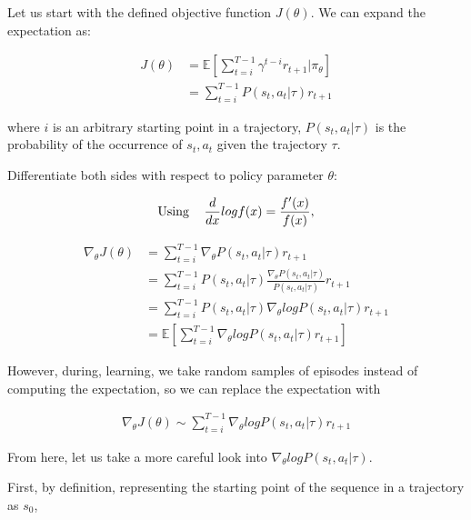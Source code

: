 \documentclass[letterpaper,11pt]{article}
\begin{document}
Let us start with the defined objective function $J(\theta)$. We can expand the expectation as:

$$
\begin{aligned}
J(\theta) &= \mathbb{E}[\sum\limits_{t=i}^{T-1} \gamma^{t-i} r_{t+1} | \pi_{\theta}] \\ &= \sum\limits_{t=i}^{T-1}P(s_{t}, a_{t} | \tau) r_{t+1}
\end{aligned}
$$

\noindent where $i$ is an arbitrary starting point in a trajectory, $P(s_{t}, a_{t} | \tau)$ is the probability of the occurrence of $s_{t}, a_{t}$ given the
trajectory $\tau$.
\vspace{0.5cm}

\noindent Differentiate both sides with respect to policy parameter $\theta$:

$$
\text{Using  \hspace{0.3cm}}
\begin{aligned}
    \frac{d}{dx} log f(x) = \frac{f'(x)}{f(x)},
\end{aligned}
$$

$$
\begin{aligned}
    \nabla_{\theta} J(\theta) & = \sum\limits_{t=i}^{T-1} \nabla_{\theta} P(s_{t}, a_{t} | \tau) r_{t+1} \\ 
    & = \sum\limits_{t=i}^{T-1} P(s_{t}, a_{t} | \tau) \frac{\nabla_{\theta} P(s_{t}, a_{t} | \tau)}{P(s_{t}, a_{t} | \tau)} r_{t+1} \\ 
    & = \sum\limits_{t=i}^{T-1} P(s_{t}, a_{t} | \tau) \nabla_{\theta} log P(s_{t}, a_{t} | \tau) r_{t+1} \\ 
    & = \mathbb{E} [\sum\limits_{t=i}^{T-1} \nabla_{\theta} log P(s_{t}, a_{t} | \tau) r_{t+1}]
\end{aligned}
$$

\noindent However, during, learning, we take random samples of episodes instead of computing the expectation, so we can replace the expectation with 

$$
\begin{aligned}
    \nabla_{\theta} J(\theta) \sim \sum\limits_{t=i}^{T-1} \nabla_{\theta} log P(s_{t}, a_{t} | \tau) r_{t+1}
\end{aligned}
$$

\noindent From here, let us take a more careful look into $\nabla_{\theta} log P(s_{t}, a_{t} | \tau) $.

First, by definition, representing the starting point of the sequence in a trajectory as $s_{0}$,
\end{document}
